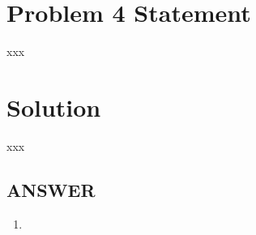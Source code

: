 \section*{Problem 4 Statement}

xxx

\section*{Solution}

xxx

\vfill
\subsection*{ANSWER}
\begin{enumerate}
    \item 
\end{enumerate}
